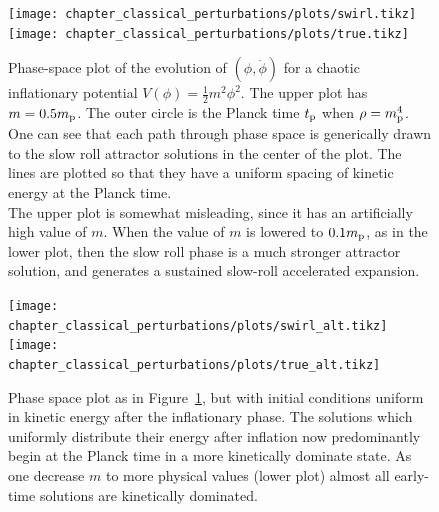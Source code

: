 \ifdefined\lightweight{}
\else
\begin{figure}
  \centering
  \texttt{[image: chapter\_classical\_perturbations/plots/swirl.tikz]}
  \texttt{[image: chapter\_classical\_perturbations/plots/true.tikz]}
  \caption{Phase-space plot of the evolution of $(\phi,\dot{\phi})$ for a chaotic inflationary potential $V(\phi) = \frac{1}{2}m^2 \phi^2$. The upper plot has $m=0.5m_{\mathrm{p}}$. The outer circle is the Planck time $t_{\mathrm{p}}$ when $\rho=m_{\mathrm{p}}^4$. One can see that each path through phase space is generically drawn to the slow roll attractor solutions in the center of the plot. The lines are plotted so that they have a uniform spacing of kinetic energy at the Planck time.\\
  The upper plot is somewhat misleading, since it has an artificially high value of $m$. When the value of $m$ is lowered to $0.1m_{\mathrm{p}}$, as in the lower plot, then the slow roll phase is a much stronger attractor solution, and generates a sustained slow-roll accelerated expansion.\label{fig:cls:linde}}
\end{figure}

\begin{figure}
  \centering
  \texttt{[image: chapter\_classical\_perturbations/plots/swirl\_alt.tikz]}
  \texttt{[image: chapter\_classical\_perturbations/plots/true\_alt.tikz]}
  \caption{Phase space plot as in Figure~\protect\ref{fig:cls:linde}, but with initial conditions uniform in kinetic energy after the inflationary phase. The solutions which uniformly distribute their energy after inflation now predominantly begin at the Planck time in a more kinetically dominate state. As one decrease $m$ to more physical values (lower plot) almost all early-time solutions are kinetically dominated.\label{fig:cls:b4infl}}
\end{figure}
\fi




